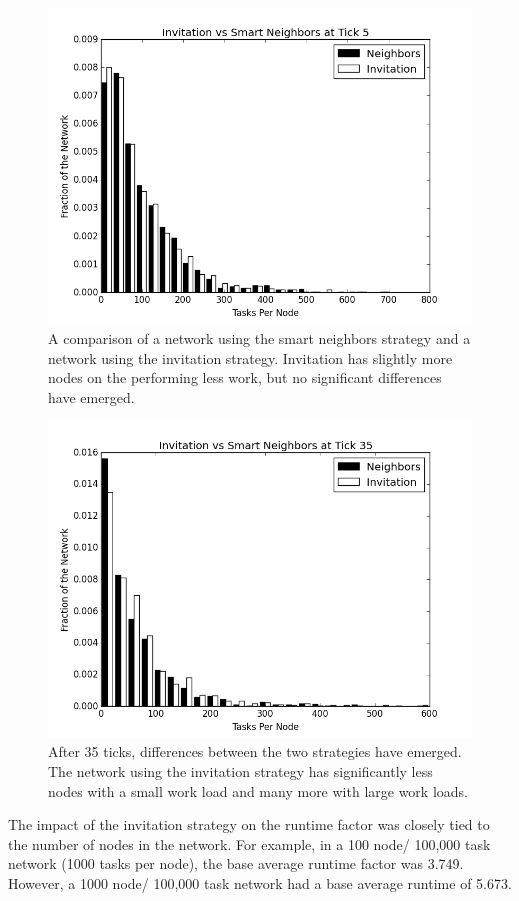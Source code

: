 \documentclass[11pt,letterpaper]{article}
\begin{document}
{	
	
	\begin{figure}
		\centering
		\includegraphics[width=0.7\linewidth]{figs/inviteNeighborsHist5}
		\caption[Invitation  vs smart neighbor injection after 5 ticks.]{A comparison of a network using the smart neighbors strategy and a network using the invitation strategy.  Invitation has slightly more nodes on the performing less work, but no significant differences have emerged.}
		\label{fig:inviteNeighborsHist5}
	\end{figure}
	
	
	\begin{figure}
		\centering
		\includegraphics[width=0.7\linewidth]{figs/inviteNeighborsHist35}
		\caption[Invitation vs smart neighbor injection after 35 ticks.]{After 35 ticks, differences between the two strategies have emerged.  The network using the invitation strategy has significantly less nodes with a small work load and many more with large work loads.}
		\label{fig:inviteNeighborsHist35}
	\end{figure}
	
	
	
	The impact of the invitation strategy on the runtime factor was closely tied to the number of nodes in the network.
	For example, in a 100 node/ 100,000 task network (1000 tasks per node), the base average runtime factor was 3.749.
	However, a 1000 node/ 100,000 task network had a base average runtime of 5.673.
	
}
\end{document}
